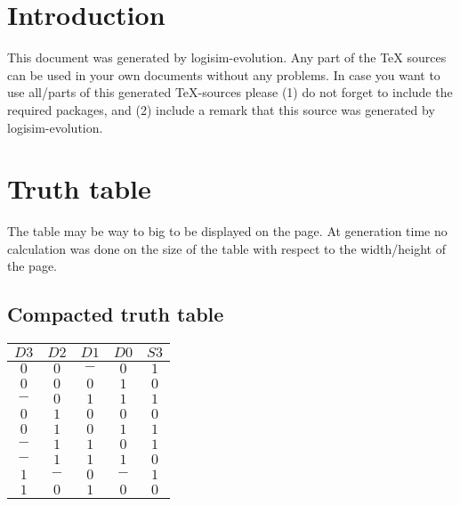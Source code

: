 \documentclass [15pt,a4paper,twoside]{article}
\begin{document}
\section{Introduction}
This document was generated by logisim-evolution. Any part of the TeX sources can be used in your own documents without any problems. In case you want to use all/parts of this generated TeX-sources please (1) do not forget to include the required packages, and (2) include a remark that this source was generated by logisim-evolution.
\section{Truth table}
The table may be way to big to be displayed on the page. At generation time no calculation was done on the size of the table with respect to the width/height of the page.
\subsection{Compacted truth table}
\begin{center}
\begin{tabular}{cccc|c}
$D3$&$D2$&$D1$&$D0$&$S3$\\
\hline
$0$&$0$&$-$&$0$&$1$\\
$0$&$0$&$0$&$1$&$0$\\
$-$&$0$&$1$&$1$&$1$\\
$0$&$1$&$0$&$0$&$0$\\
$0$&$1$&$0$&$1$&$1$\\
$-$&$1$&$1$&$0$&$1$\\
$-$&$1$&$1$&$1$&$0$\\
$1$&$-$&$0$&$-$&$1$\\
$1$&$0$&$1$&$0$&$0$\\

\end{tabular}
\end{center}
\end{document}
